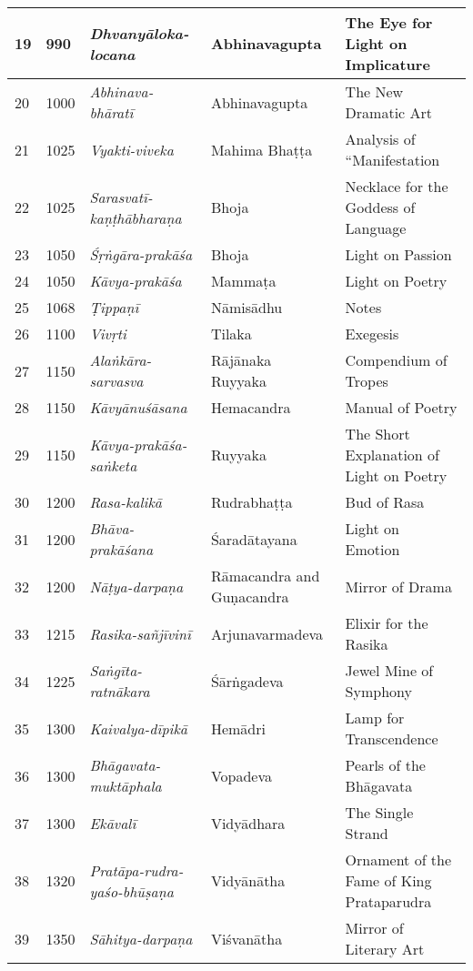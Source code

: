 \begin{longtable}{|l|l|l|l|l|}
\hline
19 & 990 & \textit{Dhvanyāloka-locana} & Abhinavagupta & The Eye for Light on Implicature \\
\hline
20 & 1000 & \textit{Abhinava-bhāratī} & Abhinavagupta & The New Dramatic Art \\
\hline
21 & 1025 & \textit{Vyakti-viveka} & Mahima Bhaṭṭa & Analysis of “Manifestation \\
\hline
22 & 1025 & \textit{Sarasvatī-kaṇṭhābharaṇa} & Bhoja & Necklace for the Goddess of Language \\
\hline
23 & 1050 & \textit{Śṛṅgāra-prakāśa} & Bhoja & Light on Passion \\
\hline
24 & 1050 & \textit{Kāvya-prakāśa} & Mammaṭa & Light on Poetry \\
\hline
25 & 1068 & \textit{Ṭippaṇī} & Nāmisādhu & Notes \\
\hline
26 & 1100 & \textit{Vivṛti} & Tilaka & Exegesis \\
\hline
27 & 1150 & \textit{Alaṅkāra-sarvasva} & Rājānaka Ruyyaka & Compendium of Tropes \\
\hline
28 & 1150 & \textit{Kāvyānuśāsana} & Hemacandra & Manual of Poetry \\
\hline
29 & 1150 & \textit{Kāvya-prakāśa-saṅketa} & Ruyyaka & The Short Explanation of Light on Poetry \\
\hline
30 & 1200 & \textit{Rasa-kalikā} & Rudrabhaṭṭa & Bud of Rasa \\
\hline
31 & 1200 & \textit{Bhāva-prakāśana} & Śaradātayana & Light on Emotion \\
\hline
32 & 1200 & \textit{Nāṭya-darpaṇa} & Rāmacandra and Guṇacandra & Mirror of Drama \\
\hline
33 & 1215 & \textit{Rasika-sañjīvinī} & Arjunavarmadeva & Elixir for the Rasika \\
\hline
34 & 1225 & \textit{Saṅgīta-ratnākara} & Śārṅgadeva & Jewel Mine of Symphony \\
\hline
35 & 1300 & \textit{Kaivalya-dīpikā} & Hemādri & Lamp for Transcendence \\
\hline
36 & 1300 & \textit{Bhāgavata-muktāphala} & Vopadeva & Pearls of the Bhāgavata \\
\hline
37 & 1300 & \textit{Ekāvalī} & Vidyādhara & The Single Strand \\
\hline
38 & 1320 & \textit{Pratāpa-rudra-yaśo-bhūṣaṇa} & Vidyānātha & Ornament of the Fame of King Prataparudra \\
\hline
39 & 1350 & \textit{Sāhitya-darpaṇa} & Viśvanātha & Mirror of Literary Art \\

\end{longtable}
